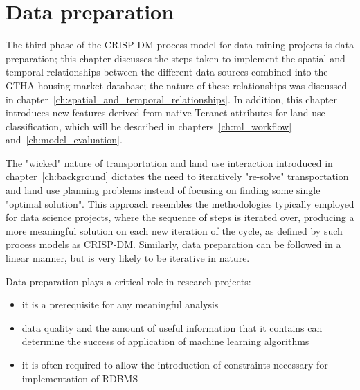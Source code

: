 \chapter{Data preparation} \label{ch:data_preparation}

The third phase of the CRISP-DM process model for data mining projects is data preparation;
this chapter discusses the steps taken to implement the spatial and temporal relationships between the different data sources combined into the GTHA housing market database;
the nature of these relationships was discussed in chapter~\ref{ch:spatial_and_temporal_relationships}.
In addition, this chapter introduces new features derived from native Teranet attributes for land use classification, which will be described in chapters~\ref{ch:ml_workflow} and~\ref{ch:model_evaluation}.

The "wicked" nature of transportation and land use interaction introduced in chapter~\ref{ch:background} dictates the need to iteratively "re-solve" transportation and land use planning problems instead of focusing on finding some single "optimal solution".
This approach resembles the methodologies typically employed for data science projects, where the sequence of steps is iterated over, producing a more meaningful solution on each new iteration of the cycle, as defined by such process models as CRISP-DM\cite{Shearer2000}.
Similarly, data preparation can be followed in a linear manner, but is very likely to be iterative in nature\cite{Brownlee2013}.

\vspace{5mm}

Data preparation plays a critical role in research projects:

\begin{itemize}
    \item it is a prerequisite for any meaningful analysis
    \item data quality and the amount of useful information that it contains can determine the success of application of machine learning algorithms\cite{RaschkaMirjalili2017}
    \item it is often required to allow the introduction of constraints necessary for implementation of RDBMS
\end{itemize}

\vspace{5mm}

